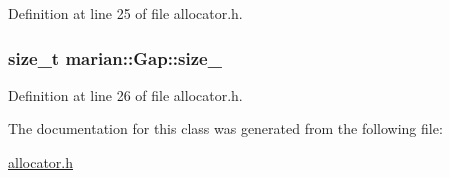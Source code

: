 Definition at line 25 of file allocator.\+h.

\subsubsection[{\texorpdfstring{size\+\_\+}{size_}}]{\setlength{\rightskip}{0pt plus 5cm}size\+\_\+t marian\+::\+Gap\+::size\+\_\+\hspace{0.3cm}{\ttfamily [private]}}\hypertarget{classmarian_1_1Gap_a6917be0d1c206f3a06094e2ef16d3f26}{}\label{classmarian_1_1Gap_a6917be0d1c206f3a06094e2ef16d3f26}


Definition at line 26 of file allocator.\+h.



The documentation for this class was generated from the following file\+:\begin{DoxyCompactItemize}
\item 
\hyperlink{allocator_8h}{allocator.\+h}\end{DoxyCompactItemize}

